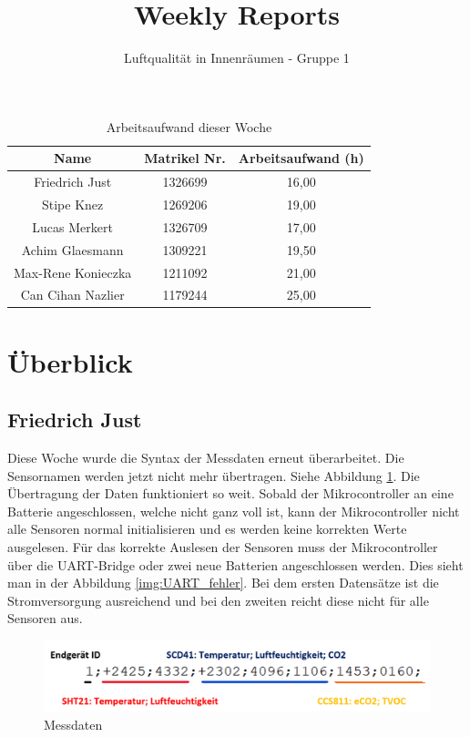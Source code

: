 \documentclass[]{article}
\title{Weekly Reports}
\author{Luftqualität in Innenräumen - Gruppe 1}
\begin{document}
\maketitle

\begin{table}[h!]
	\centering
	\begin{tabular}{|c|c|c|}
		\hline
		{\textbf{Name}}				&		{\textbf{Matrikel Nr.}} & {\textbf{Arbeitsaufwand (h)}} \\
		\hline
		Friedrich Just				&		1326699 				&		16,00\\
		\hline
		Stipe Knez					&		1269206 				&	19,00	\\
		\hline
		Lucas Merkert				&		1326709					&	17,00	\\
		\hline
		Achim Glaesmann				&		1309221					&	19,50	\\
		\hline
		Max-Rene Konieczka			&		1211092					&	21,00	\\
		\hline
		Can Cihan Nazlier			&		1179244					&	25,00	\\
		\hline
	\end{tabular}
	\caption{Arbeitsaufwand dieser Woche}
	\label{tab:worakload}
\end{table}



\section{Überblick}


\subsection{Friedrich Just}
Diese Woche wurde die Syntax der Messdaten erneut überarbeitet. Die Sensornamen werden jetzt nicht mehr übertragen. Siehe Abbildung \ref{img:Payload}. Die Übertragung der Daten funktioniert so weit. Sobald der Mikrocontroller an eine Batterie angeschlossen, welche nicht ganz voll ist, kann der Mikrocontroller nicht alle Sensoren normal initialisieren und es werden keine korrekten Werte ausgelesen. Für das korrekte Auslesen der Sensoren muss der Mikrocontroller über die UART-Bridge oder zwei neue Batterien angeschlossen werden. Dies sieht man in der  Abbildung \ref{img:UART_fehler}. Bei dem ersten Datensätze ist die Stromversorgung ausreichend und bei den zweiten reicht diese nicht für alle Sensoren aus.  

\begin{figure}[!h]
	\centering
	\includegraphics[scale=0.40]{images/payload}
	\caption{Messdaten}
	\label{img:Payload}
\end{figure}
\end{document}
